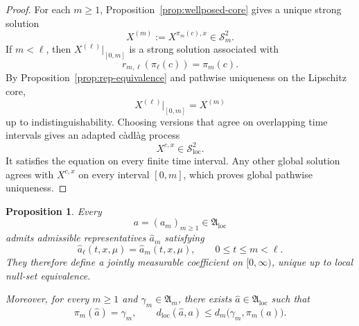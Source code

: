 \documentclass[12pt,oneside, reqno]{amsart}
\newtheorem{proposition}[theorem]{Proposition}
\numberwithin{equation}{section}
\begin{document}
	\begin{proof}
		For each \(m\geq1\), Proposition~\ref{prop:wellposed-core} gives a
		unique strong solution
		\[
		X^{(m)}:=X^{\pi_m(c),x}\in\mathcal S_m^2.
		\]
		If \(m<\ell\), then \(X^{(\ell)}|_{[0,m]}\) is a strong solution
		associated with
		\[
		r_{m,\ell}(\pi_\ell(c))=\pi_m(c).
		\]
		By Proposition~\ref{prop:rep-equivalence} and pathwise uniqueness on
		the Lipschitz core,
		\[
		X^{(\ell)}|_{[0,m]}=X^{(m)}
		\]
		up to indistinguishability. Choosing versions that agree on overlapping time intervals gives an adapted c\`adl\`ag process
		\[
		X^{c,x}\in\mathcal S_{\mathrm{loc}}^2.
		\]
		It satisfies the equation on every finite time interval. Any other
		global solution agrees with \(X^{c,x}\) on every interval
		\([0,m]\), which proves global pathwise uniqueness.
	\end{proof}
	
	
	
	\begin{proposition}
		\label{prop:compatible-global-representatives}
		Every
		\[
		a=(a_m)_{m\geq1}\in\mathfrak A_{\mathrm{loc}}
		\]
		admits admissible representatives $\widehat a_m$ satisfying
		\[
		\widehat a_\ell(t,x,\mu)
		=
		\widehat a_m(t,x,\mu),
		\qquad
		0\leq t\leq m<\ell.
		\]
		They therefore define a jointly measurable coefficient on
		$[0,\infty)$, unique up to local null-set equivalence.
		
		Moreover, for every $m\geq1$ and $\gamma_m\in\mathfrak A_m$, there exists
		$\widehat a\in\mathfrak A_{\mathrm{loc}}$ such that
		\[
		\pi_m(\widehat a)=\gamma_m,
		\qquad
		d_{\mathrm{loc}}(\widehat a,a)
		\leq
		d_m\bigl(\gamma_m,\pi_m(a)\bigr).
		\]
	\end{proposition}
	
\end{document}
